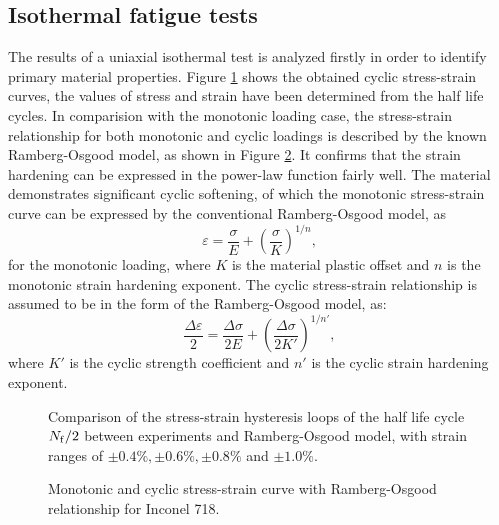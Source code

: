 \documentclass[preprint,5p,twocolumn,11pt,sort&compress]{elsarticle}
\begin{document}
\subsection{Isothermal fatigue tests}
The results of a uniaxial isothermal test is analyzed firstly in order to identify primary material properties. Figure \ref{Fig:plot_exp_half_life_cycle} shows the obtained cyclic stress-strain curves, the values of stress and strain have been determined from the half life cycles. In comparision with the monotonic loading case, the stress-strain relationship for both monotonic and cyclic loadings is described by the known Ramberg-Osgood model, as shown in Figure \ref{Fig:plot_monotonic_cyclic_osgood}. It confirms that the strain hardening can be expressed in the power-law function fairly well. The material demonstrates significant cyclic softening, of which the monotonic stress-strain curve can be expressed by the conventional Ramberg-Osgood model, as
\begin{equation}
{\varepsilon } = \frac{{\sigma }}{{E}} + {\left( {\frac{{\sigma }}{{K}}} \right)^{1/n}},
\end{equation}
for the monotonic loading, where $K$ is the material plastic offset and $n$ is the monotonic strain hardening exponent.
The cyclic stress-strain relationship is assumed to be in the form of the Ramberg-Osgood model, as:
\begin{equation}
\frac{{\Delta \varepsilon }}{2} = \frac{{\Delta \sigma }}{{2E}} + {\left( {\frac{{\Delta \sigma }}{{2K'}}} \right)^{1/n'}},
\end{equation}
where $K'$ is the cyclic strength coefficient and $n'$ is the cyclic strain hardening exponent.

\begin{figure}[!htp]
\caption{Comparison of the stress-strain hysteresis loops of the half life cycle $N_{\rm f}/2$ between experiments and Ramberg-Osgood model, with strain ranges of $\pm0.4\%, \pm0.6\%, \pm0.8\%$ and $\pm1.0\%$.}
\label{Fig:plot_exp_half_life_cycle}
\end{figure}

\begin{figure}[!htp]
\caption{Monotonic and cyclic stress-strain curve with Ramberg-Osgood relationship for Inconel 718.}
\label{Fig:plot_monotonic_cyclic_osgood}
\end{figure}
\end{document}
